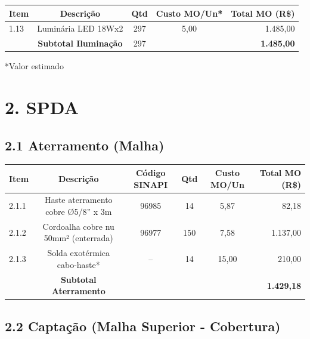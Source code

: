 \documentclass[12pt,a4paper]{article}
\renewenvironment{table}%
{\begin{center}%
\scriptsize%
\addtolength{\tabcolsep}{-2pt}%
}%
{\end{center}}
\begin{document}
\begin{table}
\centering
\begin{tabular}{lcccr}
\toprule
\textbf{Item} & \textbf{Descrição} & \textbf{Qtd} & \textbf{Custo MO/Un*} & \textbf{Total MO (R\$)} \\
\midrule
1.13 & Luminária LED 18Wx2 & 297 & 5,00 & 1.485,00 \\
\midrule
 & \textbf{Subtotal Iluminação} & 297 & & \textbf{1.485,00} \\
\bottomrule
\end{tabular}
\end{table}

\noindent\small{*Valor estimado}

\section{2. SPDA}

\subsection{2.1 Aterramento (Malha)}

\begin{table}
\centering
\begin{tabular}{lccccr}
\toprule
\textbf{Item} & \textbf{Descrição} & \textbf{Código SINAPI} & \textbf{Qtd} & \textbf{Custo MO/Un} & \textbf{Total MO (R\$)} \\
\midrule
2.1.1 & Haste aterramento cobre Ø5/8'' x 3m & 96985 & 14 & 5,87 & 82,18 \\
2.1.2 & Cordoalha cobre nu 50mm² (enterrada) & 96977 & 150 & 7,58 & 1.137,00 \\
2.1.3 & Solda exotérmica cabo-haste* & -- & 14 & 15,00 & 210,00 \\
\midrule
 & \textbf{Subtotal Aterramento} & & & & \textbf{1.429,18} \\
\bottomrule
\end{tabular}
\end{table}

\subsection{2.2 Captação (Malha Superior - Cobertura)}
\end{document}
